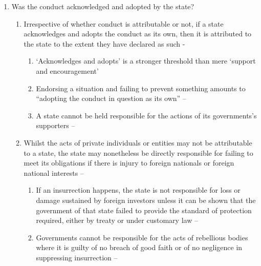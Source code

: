 \begin{enumerate}
\begin{enumerate}
\begin{enumerate}
        \end{enumerate}
        \item Was the conduct acknowledged and adopted by the state?
        \begin{enumerate}
            \item Irrespective of whether conduct is attributable or not, if a state acknowledges and adopts the conduct as its own, then it is attributed to the state to the extent they have declared as such - 
            \begin{enumerate}
                \item `Acknowledges and adopts' is a stronger threshold than mere `support and encouragement'
                \item Endorsing a situation and failing to prevent something amounts to ``adopting the conduct in question as its own'' --
                \item A state cannot be held responsible for the actions of its governments's supporters -- 
            \end{enumerate}
            \item Whilst the acts of private individuals or entities may not be attributable to a state, the state may nonetheless be directly responsible for failing to meet its obligations if there is injury to foreign nationals or foreign national interests -- 
            \begin{enumerate}
                \item If an insurrection happens, the state is not responsible for loss or damage sustained by foreign investors unless it can be shown that the government of that state failed to provide the standard of protection required, either by treaty or under customary law -- 
                \item Governments cannot be responsible for the acts of rebellious bodies where it is guilty of no breach of good faith or of no negligence in suppressing insurrection -- 
            \end{enumerate}
        \end{enumerate}
    \end{enumerate}

\end{enumerate}
